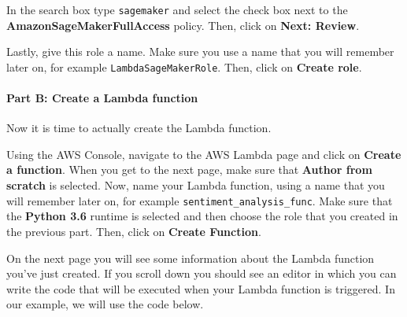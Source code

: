 \documentclass[11pt]{article}
\begin{document}
In the search box type \texttt{sagemaker} and select the check box next
to the \textbf{AmazonSageMakerFullAccess} policy. Then, click on
\textbf{Next: Review}.

Lastly, give this role a name. Make sure you use a name that you will
remember later on, for example \texttt{LambdaSageMakerRole}. Then, click
on \textbf{Create role}.

\hypertarget{part-b-create-a-lambda-function}{%
\paragraph{Part B: Create a Lambda
function}\label{part-b-create-a-lambda-function}}

Now it is time to actually create the Lambda function.

Using the AWS Console, navigate to the AWS Lambda page and click on
\textbf{Create a function}. When you get to the next page, make sure
that \textbf{Author from scratch} is selected. Now, name your Lambda
function, using a name that you will remember later on, for example
\texttt{sentiment\_analysis\_func}. Make sure that the \textbf{Python
3.6} runtime is selected and then choose the role that you created in
the previous part. Then, click on \textbf{Create Function}.

On the next page you will see some information about the Lambda function
you've just created. If you scroll down you should see an editor in
which you can write the code that will be executed when your Lambda
function is triggered. In our example, we will use the code below.
\end{document}
